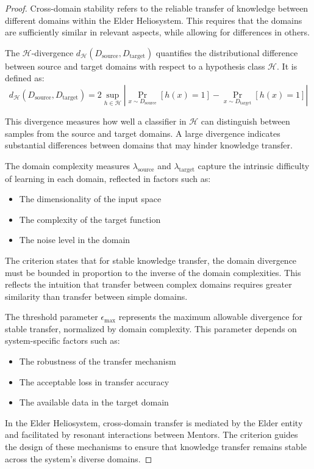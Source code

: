 \begin{proof}
Cross-domain stability refers to the reliable transfer of knowledge between different domains within the Elder Heliosystem. This requires that the domains are sufficiently similar in relevant aspects, while allowing for differences in others.

The $\mathcal{H}$-divergence $d_{\mathcal{H}}(D_{\text{source}}, D_{\text{target}})$ quantifies the distributional difference between source and target domains with respect to a hypothesis class $\mathcal{H}$. It is defined as:
\begin{equation}
d_{\mathcal{H}}(D_{\text{source}}, D_{\text{target}}) = 2 \sup_{h \in \mathcal{H}} \left|\Pr_{x \sim D_{\text{source}}}[h(x) = 1] - \Pr_{x \sim D_{\text{target}}}[h(x) = 1] \right|
\end{equation}

This divergence measures how well a classifier in $\mathcal{H}$ can distinguish between samples from the source and target domains. A large divergence indicates substantial differences between domains that may hinder knowledge transfer.

The domain complexity measures $\lambda_{\text{source}}$ and $\lambda_{\text{target}}$ capture the intrinsic difficulty of learning in each domain, reflected in factors such as:
\begin{itemize}
    \item The dimensionality of the input space
    \item The complexity of the target function
    \item The noise level in the domain
\end{itemize}

The criterion states that for stable knowledge transfer, the domain divergence must be bounded in proportion to the inverse of the domain complexities. This reflects the intuition that transfer between complex domains requires greater similarity than transfer between simple domains.

The threshold parameter $\epsilon_{\text{max}}$ represents the maximum allowable divergence for stable transfer, normalized by domain complexity. This parameter depends on system-specific factors such as:
\begin{itemize}
    \item The robustness of the transfer mechanism
    \item The acceptable loss in transfer accuracy
    \item The available data in the target domain
\end{itemize}

In the Elder Heliosystem, cross-domain transfer is mediated by the Elder entity and facilitated by resonant interactions between Mentors. The criterion guides the design of these mechanisms to ensure that knowledge transfer remains stable across the system's diverse domains.
\end{proof}


